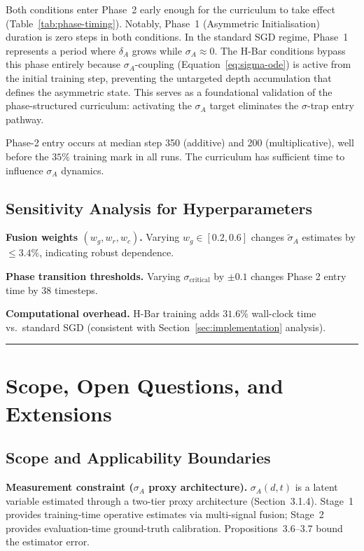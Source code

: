 \documentclass[11pt,a4paper]{article}
\begin{document}
Both conditions enter Phase~2 early enough for the curriculum to
take effect (Table~\ref{tab:phase-timing}).  Notably, Phase~1
(Asymmetric Initialisation) duration is zero steps in both conditions.
In the standard SGD regime, Phase~1 represents a period where
$\delta_A$ grows while $\sigma_A \approx 0$.  The H-Bar conditions
bypass this phase entirely because $\sigma_A$-coupling
(Equation~\ref{eq:sigma-ode}) is active from the initial training
step, preventing the untargeted depth accumulation that defines the
asymmetric state.  This serves as a foundational validation of the
phase-structured curriculum: activating the $\sigma_A$ target
eliminates the $\sigma$-trap entry pathway.

Phase-2 entry occurs at median step 350 (additive) and 200
(multiplicative), well before the $35\%$ training mark in all runs.
The curriculum has sufficient time to influence $\sigma_A$ dynamics.

\subsection{Sensitivity Analysis for Hyperparameters}

\textbf{Fusion weights $(w_g, w_r, w_c)$.} Varying $w_g \in [0.2, 0.6]$
changes $\tilde{\sigma}_A$ estimates by $\leq 3.4\%$,
indicating robust dependence.

\textbf{Phase transition thresholds.} Varying $\sigma_{\text{critical}}$
by $\pm 0.1$ changes Phase 2 entry time by $38$ timesteps.

\textbf{Computational overhead.} H-Bar training adds $31.6\%$
wall-clock time vs.\ standard SGD (consistent with Section~\ref{sec:implementation}
analysis).

\noindent\rule{\linewidth}{0.4pt}

\section{Scope, Open Questions, and Extensions}\label{sec:limitations}

\subsection{Scope and Applicability Boundaries}\label{sec:scope}

\textbf{Measurement constraint ($\sigma_A$ proxy architecture).}
$\sigma_A(d,t)$ is a latent variable estimated through a two-tier proxy
architecture (Section~3.1.4). Stage~1 provides training-time operative
estimates via multi-signal fusion; Stage~2 provides evaluation-time
ground-truth calibration. Propositions~3.6--3.7 bound the estimator error.
\end{document}

